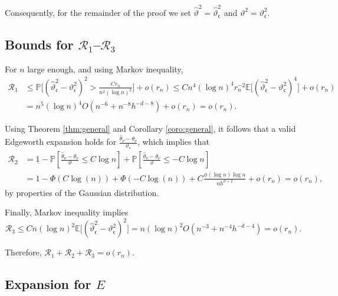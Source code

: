 \documentclass[11pt]{article}
\numberwithin{equation}{section}
\theoremstyle{definition}
\renewcommand{\P}{\mathbb{P}}
\newcommand{\E}{\mathbb{E}}
\newcommand{\Scale}{\vartheta}
\begin{document}
\bigskip
Consequently, for the remainder of the proof we set $\widehat{\Scale}^2=\widehat{\Scale}_\mathfrak{c}^2$ and $\Scale^2=\Scale_\mathfrak{c}^2$.

\subsection*{Bounds for $\mathcal{R}_1$--$\mathcal{R}_3$}

For $n$ large enough, and using Markov inequality,
\begin{align*}
    \mathcal{R}_1 &\leq \P\Big[(\widehat{\Scale}_\mathfrak{c}^2 - \Scale_\mathfrak{c}^2)^2 > \frac{C r_n}{n^2(\log n)^2} \Big] + o(r_n)
        \leq C n^4 (\log n)^{4}r_n^{-2} \E\Big[ (\widehat{\Scale}_\mathfrak{c}^2 - \Scale_\mathfrak{c}^2)^4 \Big] + o(r_n)\\
        & = n^5 (\log n)^{4} O(n^{-6} + n^{-8} h^{-d-8}) + o(r_n) = o(r_n).
\end{align*}

Using Theorem \ref{thm:general} and Corollary \ref{coro:general}, it follows that a valid Edgeworth expansion holds for $\frac{\widehat{\theta}_\nu - \theta_\nu}{\Scale_\mathfrak{c}}$, which implies that
\begin{align*}
    \mathcal{R}_2
    &= 1 - \P\left[\frac{\widehat{\theta}_\nu - \theta_\nu}{\Scale} \leq C \log n \right] + \P\left[\frac{\widehat{\theta}_\nu - \theta_\nu}{\Scale} \leq -C \log n \right]\\
    &= 1 - \Phi(C \log(n)) + \Phi(-C \log(n)) + C\frac{\phi(\log n) \log n}{nh^{d+2}}  + o(r_n) = o(r_n),
\end{align*}
by properties of the Gaussian distribution.

Finally, Markov inequality implies
\begin{equation*}
    \mathcal{R}_3 \leq C n (\log n)^2 \E\Big[ (\widehat{\Scale}_\mathfrak{c}^2 - \Scale_\mathfrak{c}^2)^2 \Big] 
        = n (\log n)^2  O(n^{-3} + n^{-4}h^{-d-4}) = o(r_n).
\end{equation*}

\bigskip
Therefore, $\mathcal{R}_1+\mathcal{R}_2+\mathcal{R}_3=o(r_n)$.

\subsection*{Expansion for $E$}
\end{document}

